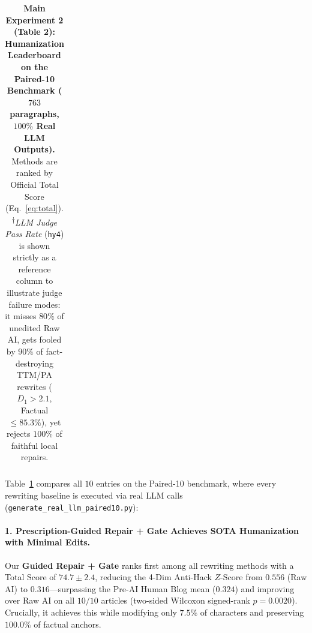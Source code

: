 \documentclass[11pt]{article}
\begin{document}
\begin{table}[t]
{\begin{tabular}{lrrrrrrrrrr}
\bottomrule
\end{tabular}%
}
\caption{\textbf{Main Experiment 2 (Table 2): Humanization Leaderboard on the Paired-10 Benchmark ($763$ paragraphs, $100\%$ Real LLM Outputs).} Methods are ranked by Official Total Score (Eq.~\ref{eq:total}). \textsuperscript{$\dagger$}\textit{LLM Judge Pass Rate} (\texttt{hy4}) is shown strictly as a reference column to illustrate judge failure modes: it misses $80\%$ of unedited Raw AI, gets fooled by $90\%$ of fact-destroying TTM/PA rewrites ($D_1 > 2.1$, Factual $\le 85.3\%$), yet rejects $100\%$ of faithful local repairs.}
\label{tab:exp2}
\end{table}

Table~\ref{tab:exp2} compares all $10$ entries on the Paired-10 benchmark, where every rewriting baseline is executed via real LLM calls (\texttt{generate\_real\_llm\_paired10.py}):

\paragraph{1. Prescription-Guided Repair + Gate Achieves SOTA Humanization with Minimal Edits.}
Our \textbf{Guided Repair + Gate} ranks first among all rewriting methods with a Total Score of \textbf{$74.7 \pm 2.4$}, reducing the 4-Dim Anti-Hack $Z$-Score from $0.556$ (Raw AI) to \textbf{$0.316$}---surpassing the Pre-AI Human Blog mean ($0.324$) and improving over Raw AI on all $10/10$ articles (two-sided Wilcoxon signed-rank $p = 0.0020$). Crucially, it achieves this while modifying only \textbf{$7.5\%$} of characters and preserving \textbf{$100.0\%$} of factual anchors.
\end{document}
